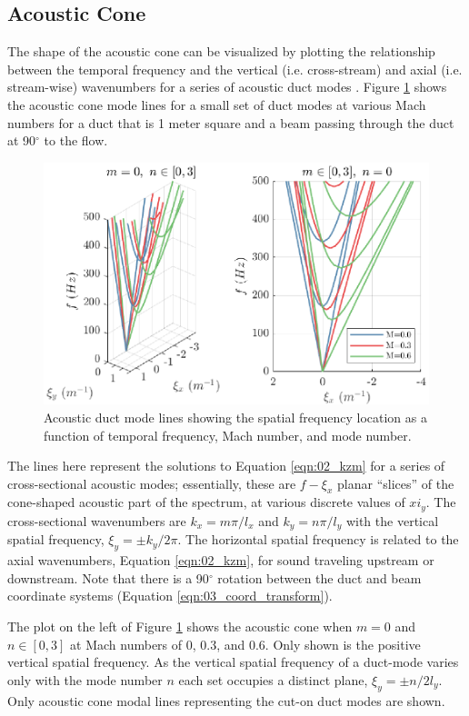 \subsection{Acoustic Cone}
\label{sect:04_acoustic_cone}
The shape of the acoustic cone can be visualized by plotting the relationship between the temporal frequency and the vertical (i.e. cross-stream) and axial (i.e. stream-wise) wavenumbers for a series of acoustic duct modes .
Figure \ref{fig:04_dispersion_sound} shows the acoustic cone mode lines for a small set of duct modes at various Mach numbers for a duct that is 1 meter square and a beam passing through the duct at 90$^\circ$ to the flow.
\begin{figure}
  \centering
  \includegraphics{../matlab/04_dispersion_analysis/dispersion_sound.eps}
  \caption{Acoustic duct mode lines showing the spatial frequency location as a function of temporal frequency, Mach number, and mode number.}
  \label{fig:04_dispersion_sound}
\end{figure}
The lines here represent the solutions to Equation \ref{eqn:02_kzm} for a series of cross-sectional acoustic modes; essentially, these are $f-\xi_x$ planar ``slices'' of the cone-shaped acoustic part of the spectrum, at various discrete values of $xi_y$.
The cross-sectional wavenumbers are $k_x = m\pi/l_x$ and $k_y = n\pi/l_y$ with the vertical spatial frequency, $\xi_y=\pm k_y/2\pi$.
The horizontal spatial frequency is related to the axial wavenumbers, Equation \ref{eqn:02_kzm}, for sound traveling upstream or downstream.
Note that there is a 90$^\circ$ rotation between the duct and beam coordinate systems (Equation \ref{eqn:03_coord_transform}).

The plot on the left of Figure \ref{fig:04_dispersion_sound} shows the acoustic cone when $m=0$ and $n\in [0,3]$ at Mach numbers of 0, 0.3, and 0.6.
Only shown is the positive vertical spatial frequency.
As the vertical spatial frequency of a duct-mode varies only with the mode number $n$ each set occupies a distinct plane, $\xi_y=\pm n/2l_y$.
Only acoustic cone modal lines representing the cut-on duct modes are shown.

